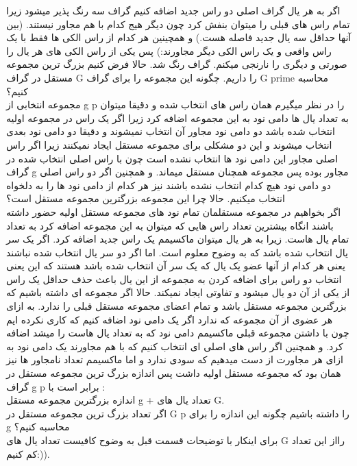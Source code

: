 \problem{}
اگر به هر یال گراف اصلی دو راس جدید اضافه کنیم گراف سه رنگ پذیر میشود زیرا
تمام راس های قبلی را میتوان بنفش کرد چون دیگر هیج کدام با هم مجاور نیستند.
(بین آنها حداقل سه یال جدید فاصله هست.)
و همچینین هر کدام از راس الکی ها فقط با یک راس واقعی و یک راس الکی دیگر مجاورند:)
پس یکی از راس الکی های هر یال را صورتی و دیگری را نارنجی میکنم.
گراف رنگ شد.
حالا فرض کنیم بزرگ ترین مجموعه مستقل در گراف G را داریم. چگونه این مجموعه را برای گراف 
G prime محاسبه کنیم؟\\
مجموعه انتخابی از g p را در نظر میگیرم همان راس های انتخاب شده
و دقیقا میتوان به تعداد یال ها  دامی نود به این مجموعه اضافه کرد
زیرا اگر یک راس در مجموعه اولیه انتخاب شده باشد 
دو دامی نود مجاور آن انتخاب نمیشوند و دقیقا دو دامی نود بعدی انتخاب میشوند
و این دو مشکلی برای مجموعه مستقل ایجاد نمیکنند زیرا
اگر راس اصلی مجاور این دامی نود ها انتخاب نشده است چون با راس اصلی انتخاب شده در گراف
g مجاور بوده
پس مجموعه همچنان مستقل میماند.
و همچنین اگر دو راس اصلی دو دامی نود هیچ کدام انتخاب نشده باشند
نیز هر کدام از دامی نود ها را به دلخواه انتخاب میکنیم.
حالا چرا این مجموعه بزرگترین مجموعه مستقل است؟\\
اگر بخواهیم در مجموعه مستقلمان تمام نود های مجموعه مستقل اولیه حضور داشته باشند
انگاه بیشترین تعداد راس هایی که میتوان به این مجموعه اضافه کرد 
به تعداد تمام یال هاست.
زیرا به هر یال میتوان ماکسیمم یک راس جدید اضافه کرد.
اگر یک سر یال انتخاب شده باشد که به وضوح معلوم است.
اما اگر دو سر یال انتخاب شده نباشند یعنی هر کدام از آنها عضو یک یال که یک سر آن انتخاب شده باشد هستند
که این یعنی انتخاب دو راس برای اضافه کردن به مجموعه از این یال
باعث حذف حداقل یک راس از یکی از آن دو یال میشود
و تفاوتی ایجاد نمیکند.
حالا اگر مجموعه ای داشته باشیم که بزرگترین مجموعه مستقل باشد
و تمام اعضای مجموعه مستقل قبلی را ندارد.
به ازای هر عضوی از آن مجموعه که ندارد
اگر یک دامی نود اضافه کنیم که کاری نکرده ایم چون با داشتن مجموعه قبلی ماکسیمم دامی 
نود که به تعداد یال هاست را میشد اضافه کرد.
و همچنین اگر راس های اصلی ای انتخاب کنیم که 
با هم مجاورند یک دامی نود به ازای هر مجاورت از دست میدهیم که سودی ندارد
و اما ماکسیمم تعداد نامجاور ها نیز همان بود که مجموعه مستقل اولیه داشت
پس اندازه بزرگ ترین مجموعه مستقل در گراف
g p برابر است با :\\
اندازه بزرگترین مجموعه مستقل g + تعداد یال های G.
\\
اگر تعداد بزرگ ترین مجموعه مستقل در G p را داشته باشیم چگونه این اندازه را برای g محاسبه کنیم؟\\
برای اینکار با توضیحات قسمت قبل به وضوح کافیست تعداد یال های
G رااز این تعداد کم کنیم:)).